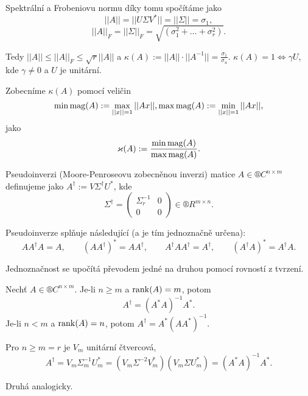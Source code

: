 \documentclass[12pt]{article}					%
\begin{document}
\begin{poznamka}
	Spektrální a Frobeniovu normu díky tomu spočítáme jako
	$$ ||A|| = ||U\Sigma V^*|| = ||\Sigma|| = \sigma_1, $$
	$$ ||A||_F = ||\Sigma||_F = \sqrt{(\sigma_1^2 + … + \sigma_r^2)}. $$

	Tedy $||A|| ≤ ||A||_F ≤ \sqrt{r}||A||$ a $\kappa(A) := ||A||·||A^{-1}|| = \frac{\sigma_1}{\sigma_n}$. $\kappa(A) = 1 \Leftrightarrow \gamma U$, kde $\gamma ≠ 0$ a $U$ je unitární.
\end{poznamka}

\begin{definice}
	Zobecníme $\kappa(A)$ pomocí veličin
	$$ \operatorname{min\,mag}(A) := \max_{||x|| = 1}||Ax||, \operatorname{max\,mag}(A) := \min_{||x||=1}||Ax||, $$
	jako
	$$ \varkappa(A) := \frac{\operatorname{min\,mag}(A)}{\operatorname{max\,mag}(A)}. $$
\end{definice}

\begin{definice}[Pseudoinverze]
	Pseudoinverzi (Moore-Penroseovu zobecněnou inverzi) matice $A \in ®C^{n \times m}$ definujeme jako
	$A^\dagger := V \Sigma^\dagger U^*$, kde
	$$ \Sigma^\dagger = \begin{pmatrix} \Sigma_r^{-1} & 0 \\ 0 & 0 \end{pmatrix} \in ®R^{m \times n}. $$
\end{definice}

\begin{tvrzeni}
	Pseudoinverze splňuje následující (a je tím jednoznačně určena):
	$$ A A^\dagger A = A, \qquad (A A^\dagger)^* = A A^\dagger, \qquad A^\dagger A A^\dagger = A^\dagger, \qquad (A^\dagger A)^* = A^\dagger A. $$

	\begin{dukazin}
		Jednoznačnost se upočítá převodem jedné na druhou pomocí rovností z tvrzení.
	\end{dukazin}
\end{tvrzeni}

\begin{lemma}
	 Nechť $A \in ®C^{n \times m}$. Je-li $n ≥ m$ a $\operatorname{rank}(A) = m$, potom
	 $$ A^\dagger = (A^* A)^{-1} A^*. $$
	 Je-li $n < m$ a $\operatorname{rank}(A) = n$, potom $A^\dagger = A^*(A A^*)^{-1}$.

	 \begin{dukazin}
	 	Pro $n ≥ m = r$ je $V_m$ unitární čtvercová,
		$$ A^\dagger = V_m \Sigma_m^{-1} U_m^* = (V_m\Sigma^{-2}V_m^*)(V_m \Sigma U_m^*) = (A^* A)^{-1} A^*. $$

		Druhá analogicky.
	 \end{dukazin}
\end{lemma}
\end{document}
